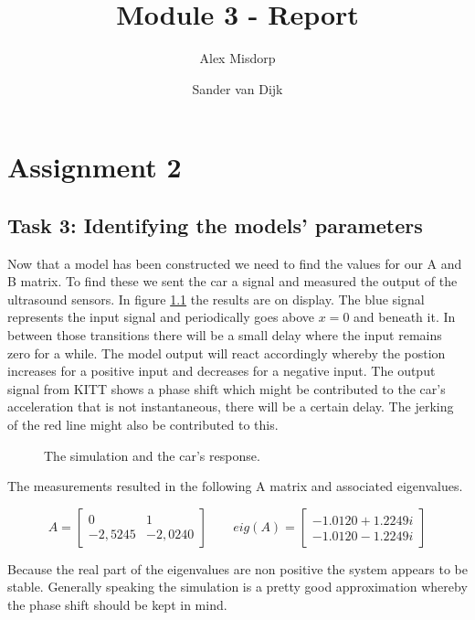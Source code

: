 \documentclass[final]{scrreprt} %
\title{Module 3 - Report}
\author{Alex {Misdorp} \and Sander {van Dijk}}
\begin{document}
\chapter{Assignment 2}
\section*{Task 3: Identifying the models' parameters}

Now that a model has been constructed we need to find the values for our A and B matrix. To find these we sent the car a signal and measured the output of the ultrasound sensors. In figure \ref{fig:KITT-input-output-model} the results are on display.
The blue signal represents the input signal and periodically goes above $x=0$ and beneath it. In between those transitions there will be a small delay where the input remains zero for a while. The model output will react accordingly whereby the postion increases for a positive input and decreases for a negative input.
The output signal from KITT shows a phase shift which might be contributed to the car's acceleration that is not instantaneous, there will be a certain delay. The jerking of the red line might also be contributed to this.

\begin{figure}[H]
	\centering
    	\setlength\figureheight{4cm}
    	\setlength{}
    	    	
    	\caption{The simulation and the car's response.}
    	\label{fig:KITT-input-output-model}
\end{figure}

The measurements resulted in the following A matrix and associated eigenvalues.

\begin{equation}
A=
\begin{bmatrix}
  0 & 1 \\
  -2,5245 & -2,0240
 \end{bmatrix}
\qquad
eig(A)=
\begin{bmatrix}
 -1.0120 + 1.2249i \\
  -1.0120 - 1.2249i
 \end{bmatrix}
\end{equation}

Because the real part of the eigenvalues are non positive the system appears to be stable. Generally speaking the simulation is a pretty good approximation whereby the phase shift should be kept in mind.
\end{document}
